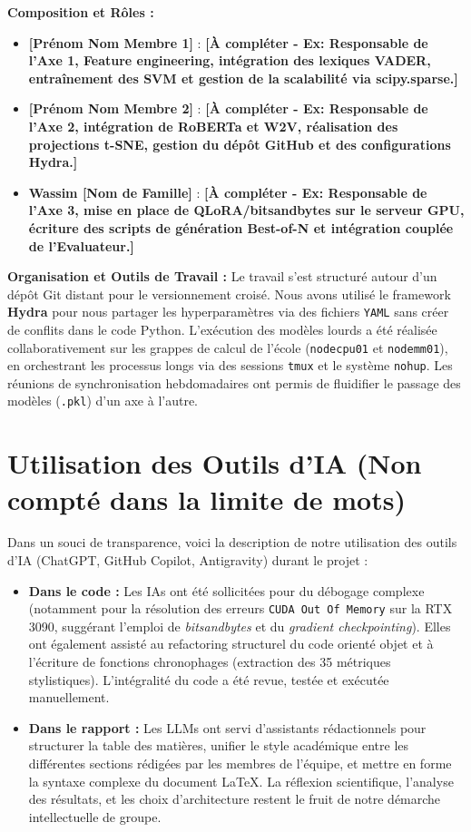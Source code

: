 \documentclass[11pt,a4paper]{article}
\begin{document}
\textbf{Composition et Rôles :}
\begin{itemize}
    \item \textbf{[Prénom Nom Membre 1]} : \textbf{[À compléter - Ex: Responsable de l'Axe 1, Feature engineering, intégration des lexiques VADER, entraînement des SVM et gestion de la scalabilité via scipy.sparse.]}
    \item \textbf{[Prénom Nom Membre 2]} : \textbf{[À compléter - Ex: Responsable de l'Axe 2, intégration de RoBERTa et W2V, réalisation des projections t-SNE, gestion du dépôt GitHub et des configurations Hydra.]}
    \item \textbf{Wassim [Nom de Famille]} : \textbf{[À compléter - Ex: Responsable de l'Axe 3, mise en place de QLoRA/bitsandbytes sur le serveur GPU, écriture des scripts de génération Best-of-N et intégration couplée de l'Evaluateur.]}
\end{itemize}

\textbf{Organisation et Outils de Travail :}
Le travail s'est structuré autour d'un dépôt Git distant pour le versionnement croisé. Nous avons utilisé le framework \textbf{Hydra} pour nous partager les hyperparamètres via des fichiers \texttt{YAML} sans créer de conflits dans le code Python. L'exécution des modèles lourds a été réalisée collaborativement sur les grappes de calcul de l'école (\texttt{nodecpu01} et \texttt{nodemm01}), en orchestrant les processus longs via des sessions \texttt{tmux} et le système \texttt{nohup}. Les réunions de synchronisation hebdomadaires ont permis de fluidifier le passage des modèles (\texttt{.pkl}) d'un axe à l'autre.

\section*{Utilisation des Outils d'IA (Non compté dans la limite de mots)}

Dans un souci de transparence, voici la description de notre utilisation des outils d'IA (ChatGPT, GitHub Copilot, Antigravity) durant le projet :
\begin{itemize}
    \item \textbf{Dans le code :} Les IAs ont été sollicitées pour du débogage complexe (notamment pour la résolution des erreurs \texttt{CUDA Out Of Memory} sur la RTX 3090, suggérant l'emploi de \textit{bitsandbytes} et du \textit{gradient checkpointing}). Elles ont également assisté au refactoring structurel du code orienté objet et à l'écriture de fonctions chronophages (extraction des 35 métriques stylistiques). L'intégralité du code a été revue, testée et exécutée manuellement.
    \item \textbf{Dans le rapport :} Les LLMs ont servi d'assistants rédactionnels pour structurer la table des matières, unifier le style académique entre les différentes sections rédigées par les membres de l'équipe, et mettre en forme la syntaxe complexe du document \LaTeX. La réflexion scientifique, l'analyse des résultats, et les choix d'architecture restent le fruit de notre démarche intellectuelle de groupe.
\end{itemize}
\end{document}
